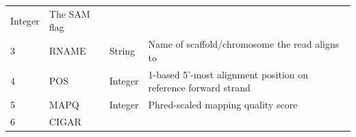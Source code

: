 \documentclass[]{krantz}
\begin{document}
\begin{longtable}[]{@{}llll@{}}
\begin{minipage}[t]{0.15\columnwidth}
Integer\strut
\end{minipage} & \begin{minipage}[t]{0.41\columnwidth}\raggedright
The SAM flag\strut
\end{minipage}\tabularnewline
\begin{minipage}[t]{0.11\columnwidth}\raggedright
3\strut
\end{minipage} & \begin{minipage}[t]{0.10\columnwidth}\raggedright
RNAME\strut
\end{minipage} & \begin{minipage}[t]{0.15\columnwidth}\raggedright
String\strut
\end{minipage} & \begin{minipage}[t]{0.41\columnwidth}\raggedright
Name of scaffold/chromosome
the read aligns to\strut
\end{minipage}\tabularnewline
\begin{minipage}[t]{0.11\columnwidth}\raggedright
4\strut
\end{minipage} & \begin{minipage}[t]{0.10\columnwidth}\raggedright
POS\strut
\end{minipage} & \begin{minipage}[t]{0.15\columnwidth}\raggedright
Integer\strut
\end{minipage} & \begin{minipage}[t]{0.41\columnwidth}\raggedright
1-based 5'-most alignment
position on reference forward
strand\strut
\end{minipage}\tabularnewline
\begin{minipage}[t]{0.11\columnwidth}\raggedright
5\strut
\end{minipage} & \begin{minipage}[t]{0.10\columnwidth}\raggedright
MAPQ\strut
\end{minipage} & \begin{minipage}[t]{0.15\columnwidth}\raggedright
Integer\strut
\end{minipage} & \begin{minipage}[t]{0.41\columnwidth}\raggedright
Phred-scaled mapping quality
score\strut
\end{minipage}\tabularnewline
\begin{minipage}[t]{0.11\columnwidth}\raggedright
6\strut
\end{minipage} & \begin{minipage}[t]{0.10\columnwidth}\raggedright
CIGAR\strut
\end{minipage} & \begin{minipage}[t]{0.15\columnwidth}\raggedright

\end{minipage}
\end{longtable}
\end{document}
